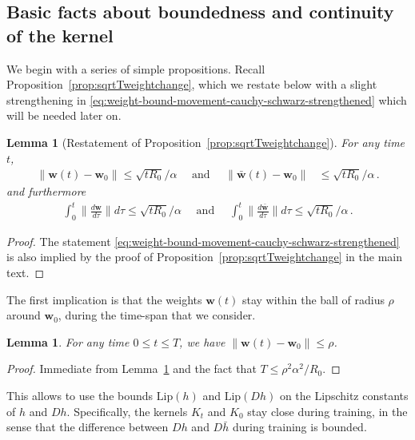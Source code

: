 \documentclass[11pt]{article} %
\newcommand{\<}{\langle}
\renewcommand{\>}{\rangle}
\def\bw{{\boldsymbol w}}
\theoremstyle{plain}
\newtheorem{lemma}[theorem]{Lemma}
\theoremstyle{definition}
\theoremstyle{remark}
\begin{document}
\begin{figure}[omitted: a diagram of this paper's results, not reproduced here]\label{fig:proof-flowchart}\end{figure}

\subsection{Basic facts about boundedness and continuity of the kernel}
We begin with a series of simple propositions. Recall Proposition~\ref{prop:sqrtTweightchange}, which we restate below with a slight strengthening in \eqref{eq:weight-bound-movement-cauchy-schwarz-strengthened} which will be needed later on.
\begin{lemma}[Restatement of Proposition~\ref{prop:sqrtTweightchange}]\label{lem:sqrtTweightchange-restated} For any time $t$,
\begin{align*}
\|\bw(t) - \bw_0\| \leq \sqrt{tR_0} / \alpha \quad \mbox{ and } \quad \|\bar\bw(t) - \bw_0\| &\leq \sqrt{tR_0} /\alpha\,.
\end{align*}
and furthermore
\begin{align}\label{eq:weight-bound-movement-cauchy-schwarz-strengthened}
\int_{0}^t \|\frac{d\bw}{d\tau}\| d\tau \leq \sqrt{t R_0} / \alpha \quad \mbox{ and } \quad \int_{0}^t \|\frac{d\bar\bw}{d\tau}\| d\tau \leq \sqrt{t R_0} / \alpha\,.\end{align}
\end{lemma}
\begin{proof}
The statement \eqref{eq:weight-bound-movement-cauchy-schwarz-strengthened} is also implied by the proof of Proposition~\ref{prop:sqrtTweightchange} in the main text.
\end{proof}
 The first implication is that the weights $\bw(t)$ stay within the ball of radius $\rho$ around $\bw_0$, during the time-span that we consider.
\begin{lemma}\label{lem:weights-ball-r}
For any time $0 \leq t \leq T$, we have $\|\bw(t) - \bw_0\| \leq \rho$.
\end{lemma}
\begin{proof}
Immediate from Lemma~\ref{lem:sqrtTweightchange-restated} and the fact that $T \leq \rho^2 \alpha^2 / R_0$.
\end{proof}
This allows to use the bounds $\mathrm{Lip}(h)$ and $\mathrm{Lip}(Dh)$ on the Lipschitz constants of $h$ and $Dh$. Specifically, the kernels $K_t$ and $K_0$ stay close during training, in the sense that the difference between $Dh$ and $D\bar{h}$ during training is bounded.
\end{document}
